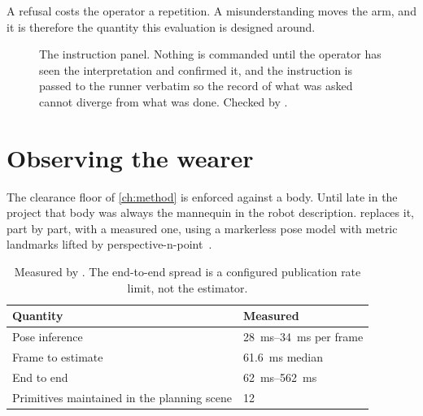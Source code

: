 A refusal costs the operator a repetition. A misunderstanding moves the arm,
and it is therefore the quantity this evaluation is designed around.

\begin{figure}[htbp]
  \centering
  \caption[Commanding a task in English]{The instruction panel. Nothing is
  commanded until the operator has seen the interpretation and confirmed it,
  and the instruction is passed to the runner verbatim so the record of what
  was asked cannot diverge from what was done. Checked by
  .}
  \label{fig:instruct}
\end{figure}

\section{Observing the wearer}
\label{sec:wearer-tracking}

The clearance floor of \cref{ch:method} is enforced against a body. Until late
in the project that body was always the mannequin in the robot description.
 replaces it, part by part,
with a measured one, using a markerless pose model with metric landmarks
lifted by perspective-n-point~\cite{lugaresi2019mediapipe}.

\begin{table}[htbp]
  \centering
  \caption[Wearer tracking rate and latency]{Measured by
  . The end-to-end spread is
  a configured publication rate limit, not the estimator.}
  \label{tab:tracking}
  \begin{tabular}{@{}ll@{}}
    \toprule
    Quantity & Measured \\
    \midrule
    Pose inference & \SIrange{28}{34}{\milli\second} per frame \\
    Frame to estimate & \SI{61.6}{\milli\second} median \\
    End to end & \SIrange{62}{562}{\milli\second} \\
    Primitives maintained in the planning scene & 12 \\
    \bottomrule
  \end{tabular}
\end{table}

